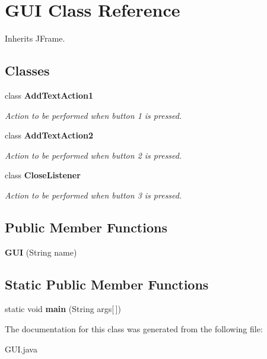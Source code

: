 \hypertarget{classGUI}{\section{G\-U\-I Class Reference}
\label{classGUI}
}


Inherits J\-Frame.

\subsection*{Classes}
\begin{DoxyCompactItemize}
\item 
class {\bfseries Add\-Text\-Action1}
\begin{DoxyCompactList}\small\item\em Action to be performed when button 1 is pressed. \end{DoxyCompactList}\item 
class {\bfseries Add\-Text\-Action2}
\begin{DoxyCompactList}\small\item\em Action to be performed when button 2 is pressed. \end{DoxyCompactList}\item 
class {\bfseries Close\-Listener}
\begin{DoxyCompactList}\small\item\em Action to be performed when button 3 is pressed. \end{DoxyCompactList}\end{DoxyCompactItemize}
\subsection*{Public Member Functions}
\begin{DoxyCompactItemize}
\item 
\hypertarget{classGUI_a27cde94f08f803589ec9026cabf65a9a}{{\bfseries G\-U\-I} (String name)}\label{classGUI_a27cde94f08f803589ec9026cabf65a9a}

\end{DoxyCompactItemize}
\subsection*{Static Public Member Functions}
\begin{DoxyCompactItemize}
\item 
\hypertarget{classGUI_a378a3d94e0171fd2a3e803892777c839}{static void {\bfseries main} (String args\mbox{[}$\,$\mbox{]})}\label{classGUI_a378a3d94e0171fd2a3e803892777c839}

\end{DoxyCompactItemize}


The documentation for this class was generated from the following file\-:\begin{DoxyCompactItemize}
\item 
G\-U\-I.\-java\end{DoxyCompactItemize}
